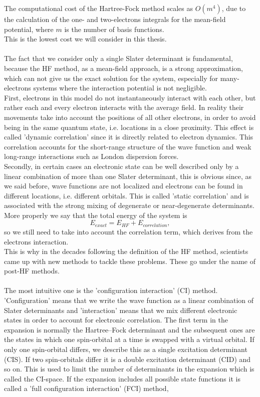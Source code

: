 The computational cost of the Hartree-Fock method scales as $O(m^4)$, due to the calculation of the one- and two-electrons integrals for the mean-field potential, where $m$ is the number of basis functions. \\
This is the lowest cost we will consider in this thesis. \\
\\
The fact that we consider only a single Slater determinant is fundamental, because the HF method, as a mean-field approach, is a strong approximation, which can not give us the exact solution for the system, especially for many-electrons systems where the interaction potential is not negligible. \\
First, electrons in this model do not instantaneously interact with each other, but rather each and every electron interacts with the average field. In reality their movements take into account the positions of all other electrons, in order to avoid being in the same quantum state, i.e. locations in a close proximity. This effect is called 'dynamic correlation' since it is directly related to electron dynamics. This correlation accounts for the short-range structure of the wave function and weak long-range interactions such as London dispersion forces. \\
Secondly, in certain cases an electronic state can be well described only by a linear combination of more than one Slater determinant, this is obvious since, as we said before, wave functions are not localized and electrons can be found in different locations, i.e. different orbitals. This is called 'static correlation' and is associated with the strong mixing of degenerate or near-degenerate determinants. \\
More properly we say that the total energy of the system is
\begin{equation}
    E_{exact} = E_{HF} + E_{correlation},
\end{equation}
so we still need to take into account the correlation term, which derives from the electrons interaction. \\
This is why in the decades following the definition of the HF method, scientists came up with new methods to tackle these problems. These go under the name of post-HF methods. \\
\\
The most intuitive one is the 'configuration interaction' (CI) method. 'Configuration' means that we write the wave function as a linear combination of Slater determinants and 'interaction' means that we mix different electronic states in order to account for electronic correlation. The first term in the expansion is normally the Hartree–Fock determinant and the subsequent ones are the states in which one spin-orbital at a time is swapped with a virtual orbital. If only one spin-orbital differs, we describe this as a single excitation determinant (CIS). If two spin-orbitals differ it is a double excitation determinant (CID) and so on. This is used to limit the number of determinants in the expansion which is called the CI-space. If the expansion includes all possible state functions it is called a 'full configuration interaction' (FCI) method,
